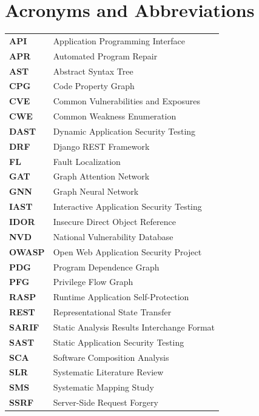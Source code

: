 \documentclass[11pt,a4paper]{report}
\begin{document}
\tableofcontents


\listoffigures


\listoftables

\chapter*{Acronyms and Abbreviations}
\begin{tabular}{@{}ll@{}}
\textbf{API}    & Application Programming Interface \\[4pt]
\textbf{APR}    & Automated Program Repair \\[4pt]
\textbf{AST}    & Abstract Syntax Tree \\[4pt]
\textbf{CPG}    & Code Property Graph \\[4pt]
\textbf{CVE}    & Common Vulnerabilities and Exposures \\[4pt]
\textbf{CWE}    & Common Weakness Enumeration \\[4pt]
\textbf{DAST}   & Dynamic Application Security Testing \\[4pt]
\textbf{DRF}    & Django REST Framework \\[4pt]
\textbf{FL}     & Fault Localization \\[4pt]
\textbf{GAT}    & Graph Attention Network \\[4pt]
\textbf{GNN}    & Graph Neural Network \\[4pt]
\textbf{IAST}   & Interactive Application Security Testing \\[4pt]
\textbf{IDOR}   & Insecure Direct Object Reference \\[4pt]
\textbf{NVD}    & National Vulnerability Database \\[4pt]
\textbf{OWASP}  & Open Web Application Security Project \\[4pt]
\textbf{PDG}    & Program Dependence Graph \\[4pt]
\textbf{PFG}    & Privilege Flow Graph \\[4pt]
\textbf{RASP}   & Runtime Application Self-Protection \\[4pt]
\textbf{REST}   & Representational State Transfer \\[4pt]
\textbf{SARIF}  & Static Analysis Results Interchange Format \\[4pt]
\textbf{SAST}   & Static Application Security Testing \\[4pt]
\textbf{SCA}    & Software Composition Analysis \\[4pt]
\textbf{SLR}    & Systematic Literature Review \\[4pt]
\textbf{SMS}    & Systematic Mapping Study \\[4pt]
\textbf{SSRF}   & Server-Side Request Forgery \\
\end{tabular}
\end{document}
